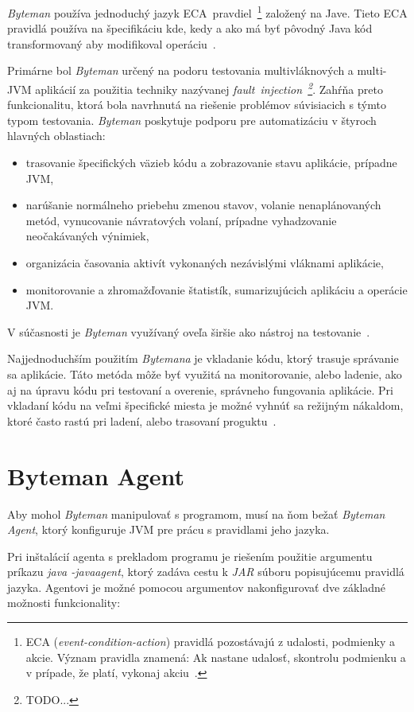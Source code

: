 \documentclass[11pt,final,oneside]{fithesis}
\begin{document}
\textit{Byteman} používa jednoduchý jazyk
ECA~pravdiel~\footnote{ECA (\textit{event-condition-action}) pravidlá 
pozostávajú z udalosti, podmienky a akcie. Význam pravidla znamená: Ak nastane 
udalosť, skontrolu podmienku a v prípade, že platí, vykonaj
akciu~\cite{Sellis:ECARules}.} založený na Jave. Tieto ECA pravidlá
používa na špecifikáciu kde, kedy a ako má byť pôvodný Java kód transformovaný
aby modifikoval operáciu~\cite{RedHat:Byteman}.

Primárne bol \textit{Byteman} určený na podoru testovania multivláknových a
multi-JVM aplikácií za použitia techniky nazývanej
\textit{fault~injection~\footnote{TODO...}}. Zahŕňa preto funkcionalitu, ktorá 
bola navrhnutá na riešenie problémov súvisiacich s týmto typom testovania.
\textit{Byteman} poskytuje podporu pre automatizáciu v štyroch hlavných 
oblastiach:

\begin{itemize}
\item trasovanie špecifických väzieb kódu a zobrazovanie stavu 
aplikácie, prípadne JVM,
\item narúšanie normálneho priebehu zmenou stavov, volanie nenaplánovaných
metód, vynucovanie návratových volaní, prípadne vyhadzovanie neočakávaných 
výnimiek,
\item organizácia časovania aktivít vykonaných nezávislými vláknami aplikácie,
\item monitorovanie a zhromažďovanie štatistík, sumarizujúcich aplikáciu a
operácie JVM.
\end{itemize}

V súčasnosti je \textit{Byteman} využívaný oveľa širšie ako nástroj na
testovanie~\cite{RedHat:Byteman}. 

Najjednoduchším použitím \textit{Bytemana} je vkladanie kódu, ktorý trasuje 
správanie sa aplikácie. Táto metóda môže byť využitá na monitorovanie,
alebo ladenie, ako aj na úpravu kódu pri testovaní a overenie, správneho 
fungovania aplikácie. Pri vkladaní kódu na veľmi špecifické miesta je možné
vyhnúť sa režijným nákaldom, ktoré často rastú pri ladení, alebo trasovaní 
proguktu~\cite{Byteman:Homepage}.

\section{Byteman Agent}
Aby mohol \textit{Byteman} manipulovať s programom, musí na ňom bežať
\textit{Byteman Agent}, ktorý konfiguruje JVM pre prácu s pravidlami
jeho jazyka.

Pri inštalácií agenta s prekladom programu je riešením použitie argumentu
príkazu \textit{java -javaagent}, ktorý zadáva cestu k \textit{JAR} súboru
popisujúcemu pravidlá jazyka. Agentovi je možné pomocou argumentov
nakonfigurovať dve základné možnosti funkcionality:
\end{document}
